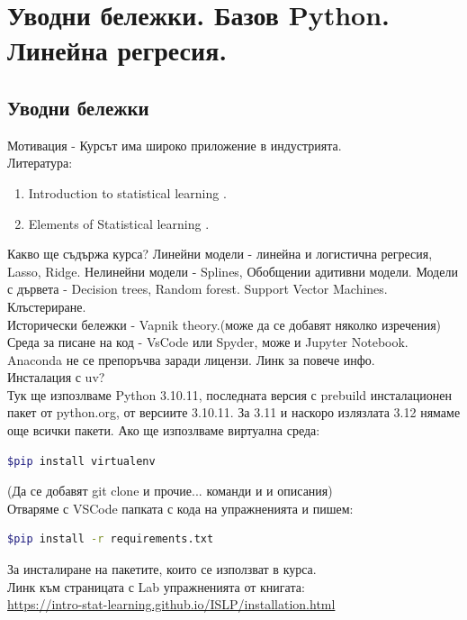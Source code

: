 \section{Уводни бележки. Базов Python. Линейна регресия.}
	\subsection{Уводни бележки}
	Мотивация - Курсът има широко приложение в индустрията.\\	
	Литература:
	\begin{enumerate}
	\item  Introduction to statistical learning \cite{james2023introduction}.
	\item  Elements of Statistical learning  \cite{hastie01statisticallearning}.
	\end{enumerate}
	
	\noindent
	Какво ще съдържа курса? Линейни модели - линейна и логистична регресия, Lasso, Ridge. Нелинейни модели - Splines, Обобщении адитивни модели.
	Модели с дървета - Decision trees, Random forest. Support Vector Machines. Клъстериране.   \\
	
	\noindent
	Исторически бележки - Vapnik theory.(може да се добавят няколко изречения) \\

	\noindent	
	Среда за писане на код - VsCode или Spyder, може и Jupyter Notebook. Anaconda не се препоръчва заради лицензи. Линк за повече инфо. \\
	Инсталация с uv? \\
 	Тук ще изпозлваме Python 3.10.11, последната версия с prebuild инсталационен пакет от python.org,
 	от версиите 3.10.11. За 3.11 и наскоро излязлата 3.12 нямаме още всички пакети. Ако ще изпозлваме виртуална среда: 	
 	\begin{lstlisting}[language=bash]
$pip install virtualenv
 	\end{lstlisting}
 	(Да се добавят git clone и прочие... команди и и описания) \\
 	
 	Отваряме с VSCode папката с кода на упражненията и пишем:
	\begin{lstlisting}[language=bash]
$pip install -r requirements.txt
 	\end{lstlisting}
 	За инсталиране на пакетите, които се използват в курса. \\
 	Линк към страницата с Lab упражненията от книгата:\\
 	\href{https://intro-stat-learning.github.io/ISLP/installation.html}{https://intro-stat-learning.github.io/ISLP/installation.html}
 	
